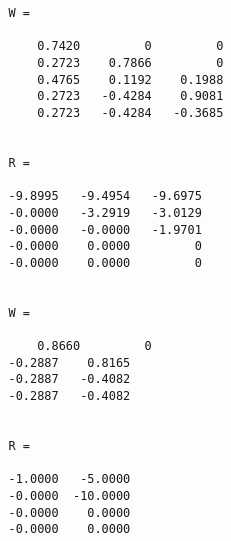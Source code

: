 \documentclass[11pt]{article}
\begin{document}
\begin{enumerate}
\begin{verbatim}
                W =

                    0.7420         0         0
                    0.2723    0.7866         0
                    0.4765    0.1192    0.1988
                    0.2723   -0.4284    0.9081
                    0.2723   -0.4284   -0.3685


                R =

                -9.8995   -9.4954   -9.6975
                -0.0000   -3.2919   -3.0129
                -0.0000   -0.0000   -1.9701
                -0.0000    0.0000         0
                -0.0000    0.0000         0


                W =

                    0.8660         0
                -0.2887    0.8165
                -0.2887   -0.4082
                -0.2887   -0.4082


                R =

                -1.0000   -5.0000
                -0.0000  -10.0000
                -0.0000    0.0000
                -0.0000    0.0000
        \end{verbatim}

\end{enumerate}
\end{document}
